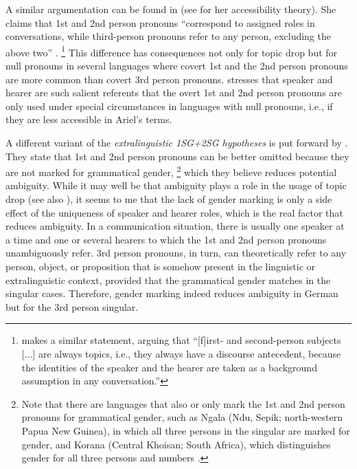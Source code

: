 A similar argumentation can be found in \cite{ariel1990} (see  for her accessibility theory).
She claims that 1st and 2nd person pronouns ``correspond to assigned roles in conversations, while third-person pronouns refer to any person, excluding the above two'' \citep[47]{ariel1990}.%
\footnote{\citet[128]{zdorenko2010} makes a similar statement, arguing that ``[f]irst- and second-person subjects [...] are always topics, i.e., they always have a discourse antecedent,  because the identities of the speaker and the hearer are taken as a background assumption in any conversation.''}
%
This difference has consequences not only for topic drop but for null pronouns in several languages where covert 1st and the 2nd person pronouns are more common than covert  3rd person pronouns.
\citet[48]{ariel1990} stresses that speaker and hearer are such salient  referents that the overt 1st and 2nd person pronouns are only used under special circumstances in languages with null pronouns, i.e., if they are less accessible in Ariel's terms.

A different variant of the \textit{extralinguistic 1SG+2SG hypotheses} is put forward by \citet[218]{volodina.onea2012}.
They state that 1st and 2nd person pronouns can be better omitted because they are not marked for grammatical gender,%
\footnote{Note that there are languages that also or only mark the 1st and 2nd person pronouns for grammatical gender, such as Ngala (Ndu, Sepik; north-western Papua New Guinea), in which all three persons in the singular are marked for gender, and Korana (Central Khoisan; South Africa),  which distinguishes gender for all three persons and numbers \citep{wals-44}.}
%
which they believe reduces potential ambiguity. 
While it may well be that ambiguity  plays a role in the usage of topic drop (see also ), it seems to me that the lack of gender marking is only a side effect of the uniqueness of speaker and hearer roles, which is the real factor that reduces ambiguity. 
In a communication situation, there is usually one speaker at a time and one or several hearers to which the 1st and 2nd person pronouns unambiguously refer.
3rd person pronouns, in turn, can theoretically refer to any person, object, or proposition that is somehow present in the linguistic or extralinguistic context, provided that the grammatical gender matches in the singular cases.
Therefore, gender marking indeed reduces ambiguity  in German but for the 3rd person singular.

